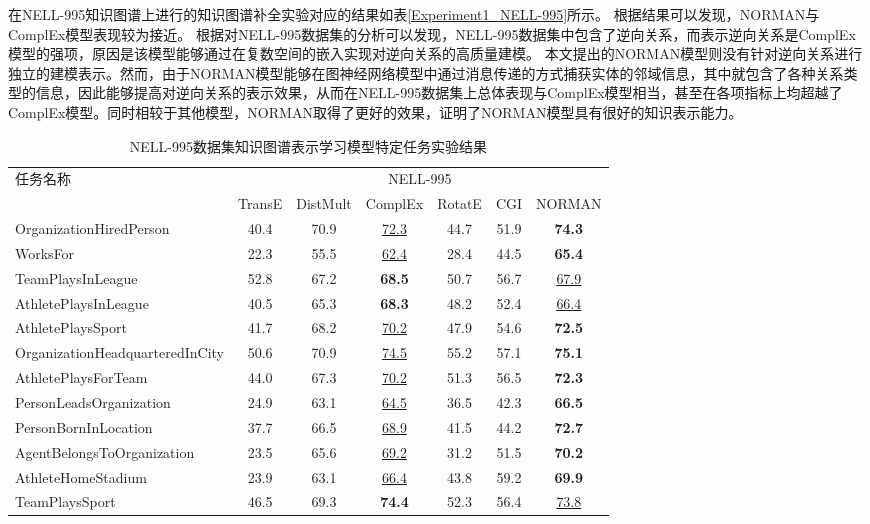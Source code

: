 \documentclass[algorithmlist, AutoFakeBold, AutoFakeSlant, figurelist, tablelist, nomlist, engineering, openany]{seuthesix} %
\begin{document}
在NELL-995知识图谱上进行的知识图谱补全实验对应的结果如表\ref{Experiment1_NELL-995}所示。
根据结果可以发现，NORMAN与ComplEx模型表现较为接近。
根据对NELL-995数据集的分析可以发现，NELL-995数据集中包含了逆向关系，而表示逆向关系是ComplEx模型的强项，原因是该模型能够通过在复数空间的嵌入实现对逆向关系的高质量建模。
本文提出的NORMAN模型则没有针对逆向关系进行独立的建模表示。然而，由于NORMAN模型能够在图神经网络模型中通过消息传递的方式捕获实体的邻域信息，其中就包含了各种关系类型的信息，因此能够提高对逆向关系的表示效果，从而在NELL-995数据集上总体表现与ComplEx模型相当，甚至在各项指标上均超越了ComplEx模型。同时相较于其他模型，NORMAN取得了更好的效果，证明了NORMAN模型具有很好的知识表示能力。

\begin{table}[t]
  \centering
  \caption{NELL-995数据集知识图谱表示学习模型特定任务实验结果}
  \begin{tabular*}{0.95\textwidth}{@{\extracolsep{\fill}}lcccccc}
    \toprule[1pt]
    \multirow{2}{*}{\small{任务名称}} & \multicolumn{6}{c}{\small{NELL-995}} \\
      & \small{TransE} & \small{DistMult} & \small{ComplEx} & \small{RotatE} & \small{CGI} & \small{NORMAN} \\ \hline
    \small{OrganizationHiredPerson} & 40.4 & 70.9 & \underline{72.3} & 44.7 & 51.9 & \textbf{74.3} \\
    \small{WorksFor} & 22.3 & 55.5 & \underline{62.4} & 28.4 & 44.5 & \textbf{65.4} \\
    \small{TeamPlaysInLeague} & 52.8 & 67.2 & \textbf{68.5} & 50.7 & 56.7 & \underline{67.9} \\
    \small{AthletePlaysInLeague} & 40.5 & 65.3 & \textbf{68.3} & 48.2 & 52.4 & \underline{66.4} \\
    \small{AthletePlaysSport} & 41.7 & 68.2 & \underline{70.2} & 47.9 & 54.6 & \textbf{72.5} \\
    \small{OrganizationHeadquarteredInCity} & 50.6 & 70.9 & \underline{74.5} & 55.2 & 57.1 & \textbf{75.1} \\
    \small{AthletePlaysForTeam} & 44.0 & 67.3 & \underline{70.2} & 51.3 & 56.5 & \textbf{72.3} \\
    \small{PersonLeadsOrganization} & 24.9 & 63.1 & \underline{64.5} & 36.5 & 42.3 & \textbf{66.5} \\
    \small{PersonBornInLocation} & 37.7 & 66.5 & \underline{68.9} & 41.5 & 44.2 & \textbf{72.7} \\
    \small{AgentBelongsToOrganization} & 23.5 & 65.6 & \underline{69.2} & 31.2 & 51.5 & \textbf{70.2} \\
    \small{AthleteHomeStadium} & 23.9 & 63.1 & \underline{66.4} & 43.8 & 59.2 & \textbf{69.9} \\
    \small{TeamPlaysSport} & 46.5 & 69.3 & \textbf{74.4} & 52.3 & 56.4 & \underline{73.8} \\
    \bottomrule[1pt]
  \end{tabular*}
  \label{Experiment1_tasks1}
\end{table}
\end{document}
